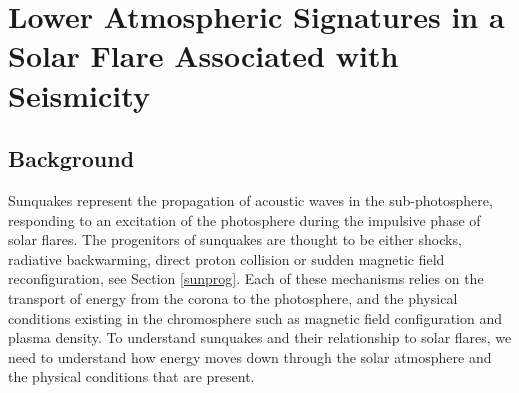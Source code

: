\section{Lower Atmospheric Signatures in a Solar Flare Associated with Seismicity}




\subsection{Background} 
Sunquakes represent the propagation of acoustic waves in the sub-photosphere, responding to an excitation of the photosphere during the impulsive phase of solar flares. The progenitors of sunquakes are thought to be either shocks, radiative backwarming, direct proton collision or sudden magnetic field reconfiguration, see Section \ref{sunprog}. Each of these mechanisms relies on the transport of energy from the corona to the photosphere, and the physical conditions existing in the chromosphere such as magnetic field configuration and plasma density. To understand sunquakes and their relationship to solar flares, we need to understand how energy moves down through the solar atmosphere and the physical conditions that are present. \\

